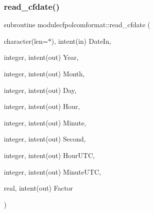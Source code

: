 \mbox{\label{namespacemodulecfpolcomformat_a629c520b52ec9b466d91469b40321b35}} 
\subsubsection{\texorpdfstring{read\+\_\+cfdate()}{read\_cfdate()}}
{\footnotesize\ttfamily subroutine modulecfpolcomformat\+::read\+\_\+cfdate (\begin{DoxyParamCaption}\item[{character(len=$\ast$), intent(in)}]{Date\+In,  }\item[{integer, intent(out)}]{Year,  }\item[{integer, intent(out)}]{Month,  }\item[{integer, intent(out)}]{Day,  }\item[{integer, intent(out)}]{Hour,  }\item[{integer, intent(out)}]{Minute,  }\item[{integer, intent(out)}]{Second,  }\item[{integer, intent(out)}]{Hour\+U\+TC,  }\item[{integer, intent(out)}]{Minute\+U\+TC,  }\item[{real, intent(out)}]{Factor }\end{DoxyParamCaption})\hspace{0.3cm}{\ttfamily [private]}}

